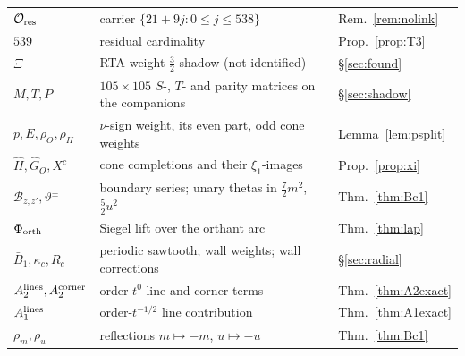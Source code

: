 \begin{center}
\begin{longtable}{p{3.2cm}p{9.3cm}p{2.4cm}}
$\mathcal O_{\rm res}$ & carrier $\{21+9j:0\le j\le538\}$ & Rem.~\ref{rem:nolink}\\
$539$ & residual cardinality & Prop.~\ref{prop:T3}\\
$\Xi$ & RTA weight-$\frac32$ shadow (not identified) & \S\ref{sec:found}\\
$M,T,P$ & $105\times105$ $S$-, $T$- and parity matrices on the companions & \S\ref{sec:shadow}\\
$p,E,\rho_O,\rho_H$ & $\nu$-sign weight, its even part, odd cone weights & Lemma~\ref{lem:psplit}\\
$\widehat H,\widehat G_O,X^c$ & cone completions and their $\xi_1$-images & Prop.~\ref{prop:xi}\\
$\mathcal B_{z,z'},\vartheta^\pm$ & boundary series; unary thetas in $\frac72m^2$, $\frac52u^2$ & Thm.~\ref{thm:Bc1}\\
$\Phi_{\rm orth}$ & Siegel lift over the orthant arc & Thm.~\ref{thm:lap}\\
$\bar B_1,\kappa_c,R_c$ & periodic sawtooth; wall weights; wall corrections & \S\ref{sec:radial}\\
$A_2^{\rm lines},A_2^{\rm corner}$ & order-$t^0$ line and corner terms & Thm.~\ref{thm:A2exact}\\
$A_1^{\rm lines}$ & order-$t^{-1/2}$ line contribution & Thm.~\ref{thm:A1exact}\\
$\rho_m,\rho_u$ & reflections $m\mapsto-m$, $u\mapsto-u$ & Thm.~\ref{thm:Bc1}\\
\bottomrule
\end{longtable}
\end{center}
\clearpage
